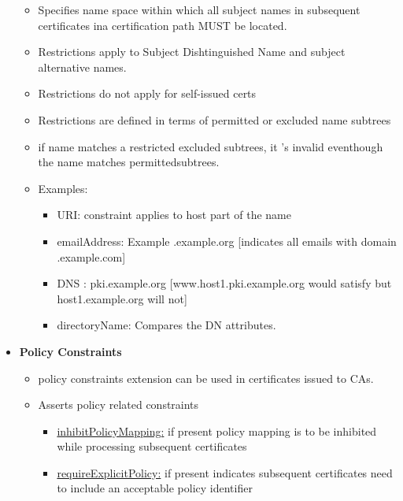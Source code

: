 \documentclass[a4paper]{article}
\begin{document}
\begin{itemize}
\begin{itemize}
                    \item Specifies name space within which all subject names in 
                        subsequent certificates ina certification path MUST be located.
                    \item Restrictions apply to Subject Dishtinguished Name and 
                        subject alternative names.
                    \item Restrictions do not apply for self-issued certs
                    \item Restrictions are defined in terms of permitted or excluded name subtrees
                    \item if name matches a restricted excluded subtrees, it 's invalid eventhough the name matches permittedsubtrees.
                    \item Examples:
                    \begin{itemize}
                        \item URI:  constraint applies to host part of the name
                        \item emailAddress: Example .example.org [indicates all emails with domain .example.com]
                        \item DNS : pki.example.org [www.host1.pki.example.org would satisfy but host1.example.org will not]
                        \item directoryName: Compares the DN attributes. 
                    \end{itemize}
                \end{itemize}
            \item \textbf{Policy Constraints}
                \begin{itemize}
                    \item policy constraints extension can be used in certificates issued to CAs.
                    \item Asserts policy related constraints
                        \begin{itemize}
                            \item \underline{inhibitPolicyMapping:} if present policy mapping is to be inhibited while processing subsequent certificates
                            \item \underline{requireExplicitPolicy:} if present indicates subsequent certificates need to include an acceptable policy identifier
                        \end{itemize}

\end{itemize}
\end{itemize}
\end{document}
